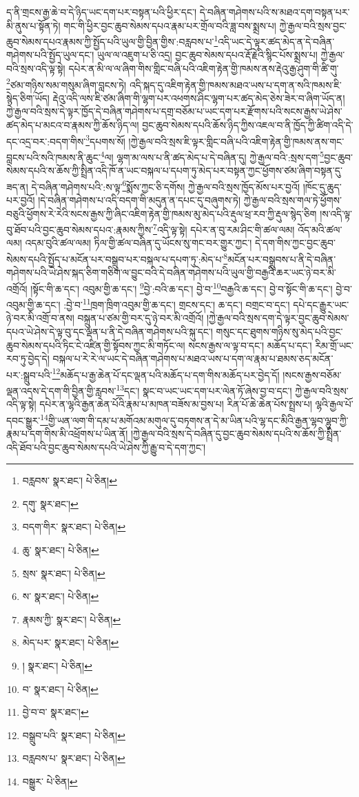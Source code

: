 ད་ནི་གྲངས་རྒྱ་ཆེ་བ་དེ་ཉིད་ཡང་དག་པར་བསྟན་པའི་ཕྱིར་དང་། དེ་བཞིན་གཤེགས་པའི་ས་མཐའ་དག་བསྟན་པར་མི་ནུས་པ་སྟོན་ཏེ། གང་གི་ཕྱིར་བྱང་ཆུབ་སེམས་དཔའ་རྣམ་པར་གྲོལ་བའི་ཟླ་བས་སྨྲས་པ། ཀྱེ་རྒྱལ་བའི་སྲས་བྱང་ཆུབ་སེམས་དཔའ་རྣམས་ཀྱི་སྤྱོད་པའི་ཡུལ་གྱི་བྱིན་གྱིས་:བརླབས་པ་\footnote{བརླབས་  སྣར་ཐང་།  པེ་ཅིན། }འདི་ཡང་དེ་ལྟར་ཚད་མེད་ན་དེ་བཞིན་གཤེགས་པའི་སྤྱོད་ཡུལ་དང་། ཡུལ་ལ་འཇུག་པ་ཅི་འདྲ། བྱང་ཆུབ་སེམས་དཔའ་རྡོ་རྗེའི་སྙིང་པོས་སྨྲས་པ། ཀྱེ་རྒྱལ་བའི་སྲས་འདི་ལྟ་སྟེ། དཔེར་ན་མི་ལ་ལ་ཞིག་གིས་གླིང་བཞི་པའི་འཇིག་རྟེན་གྱི་ཁམས་ནས་རྡེའུ་རྒྱ་ཤུག་གི་ཚི་གུ་\footnote{དགུ་  སྣར་ཐང་། }ཙམ་གཉིས་སམ་གསུམ་ཞིག་བླངས་ཏེ། འདི་སྐད་དུ་འཇིག་རྟེན་གྱི་ཁམས་མཐའ་ཡས་པ་དག་ན་སའི་ཁམས་ཇི་སྙེད་ཅིག་ཡོད། རྡེའུ་འདི་ལས་ཇི་ཙམ་ཞིག་གི་ལྷག་པར་འཕགས་ཤིང་ལྷག་པར་ཚད་མེད་ཅེས་ཟེར་བ་ཞིག་ཡོད་ན། ཀྱེ་རྒྱལ་བའི་སྲས་དེ་ལྟར་ཁྱོད་དེ་བཞིན་གཤེགས་པ་དགྲ་བཅོམ་པ་ཡང་དག་པར་རྫོགས་པའི་སངས་རྒྱས་ཡེ་ཤེས་ཚད་མེད་པ་མངའ་བ་རྣམས་ཀྱི་ཆོས་ཉིད་ལ། བྱང་ཆུབ་སེམས་དཔའི་ཆོས་ཉིད་ཀྱིས་འཇལ་བ་ནི་ཁྱོད་ཀྱི་ཚིག་འདི་དེ་དང་འདྲ་བར་:བདག་གིས་\footnote{བདག་གིར་  སྣར་ཐང་།  པེ་ཅིན། }དཔགས་སོ། །ཀྱེ་རྒྱལ་བའི་སྲས་ཇི་ལྟར་གླིང་བཞི་པའི་འཇིག་རྟེན་གྱི་ཁམས་ནས་གང་བླངས་པའི་སའི་ཁམས་ནི་ཆུང་\footnote{ཆུ་  སྣར་ཐང་།  པེ་ཅིན། }ལ། ལྷག་མ་ལས་པ་ནི་ཚད་མེད་པ་དེ་བཞིན་དུ། ཀྱེ་རྒྱལ་བའི་:སྲས་དག་\footnote{སྲས་  སྣར་ཐང་།  པེ་ཅིན། }བྱང་ཆུབ་སེམས་དཔའི་ས་ཆོས་ཀྱི་སྤྲིན་འདི་ཁོ་ན་ཡང་བསྐལ་པ་དཔག་ཏུ་མེད་པར་བསྟན་ཀྱང་ཕྱོགས་ཙམ་ཞིག་བསྟན་དུ་ཟད་ན། དེ་བཞིན་གཤེགས་པའི་:ས་ལྟ་\footnote{ས་  སྣར་ཐང་།  པེ་ཅིན། }སྨོས་ཀྱང་ཅི་དགོས། ཀྱེ་རྒྱལ་བའི་སྲས་ཁྱོད་མོས་པར་བྱའོ། །ཁོང་དུ་ཆུད་པར་བྱའོ། །དེ་བཞིན་གཤེགས་པ་འདི་བདག་གི་མདུན་ན་དཔང་དུ་བཞུགས་ཏེ། ཀྱེ་རྒྱལ་བའི་སྲས་གལ་ཏེ་ཕྱོགས་བཅུའི་ཕྱོགས་རེ་རེའི་སངས་རྒྱས་ཀྱི་ཞིང་འཇིག་རྟེན་གྱི་ཁམས་མུ་མེད་པའི་རྡུལ་ཕྲ་རབ་ཀྱི་རྡུལ་སྙེད་ཅིག །ས་འདི་ལྟ་བུ་ཐོབ་པའི་བྱང་ཆུབ་སེམས་དཔའ་:རྣམས་ཀྱིས་\footnote{རྣམས་ཀྱི་  སྣར་ཐང་།  པེ་ཅིན། }འདི་ལྟ་སྟེ། དཔེར་ན་བུ་རམ་ཤིང་གི་ཚལ་ལམ། འོད་མའི་ཚལ་ལམ། འདམ་བུའི་ཚལ་ལམ། ཏིལ་གྱི་ཚལ་བཞིན་དུ་ཡོངས་སུ་གང་བར་གྱུར་ཀྱང་། དེ་དག་གིས་ཀྱང་བྱང་ཆུབ་སེམས་དཔའི་སྤྱོད་པ་མངོན་པར་བསྒྲུབ་པར་བསྐལ་པ་དཔག་ཏུ་:མེད་པ་\footnote{མེད་པར་  སྣར་ཐང་།  པེ་ཅིན། }མངོན་པར་བསྒྲུབས་པ་ནི་དེ་བཞིན་གཤེགས་པའི་ཡེ་ཤེས་སྐད་ཅིག་གཅིག་ལ་བྱུང་བའི་དེ་བཞིན་གཤེགས་པའི་ཡུལ་གྱི་བརྒྱའི་ཆར་ཡང་ཉེ་བར་མི་འགྲོའོ། །སྟོང་གི་ཆ་དང་། འབུམ་གྱི་ཆ་དང་། \footnote{།    སྣར་ཐང་།  པེ་ཅིན། }བྱེ་:བའི་ཆ་དང་། བྱེ་བ་\footnote{བ་  སྣར་ཐང་།  པེ་ཅིན། }བརྒྱའི་ཆ་དང་། བྱེ་བ་སྟོང་གི་ཆ་དང་། བྱེ་བ་འབུམ་གྱི་ཆ་དང་། :བྱེ་བ་\footnote{བྱེ་བ་བ་  སྣར་ཐང་། }ཁྲག་ཁྲིག་འབུམ་གྱི་ཆ་དང་། གྲངས་དང་། ཆ་དང་། བགྲང་བ་དང་། དཔེ་དང་རྒྱུར་ཡང་ཉེ་བར་མི་འགྲོ་བ་ནས། བསྐྲུན་པ་ཙམ་གྱི་བར་དུ་ཉེ་བར་མི་འགྲོའོ། །ཀྱེ་རྒྱལ་བའི་སྲས་དག་དེ་ལྟར་བྱང་ཆུབ་སེམས་དཔའ་ཡེ་ཤེས་དེ་ལྟ་བུ་དང་ལྡན་པ་ནི་དེ་བཞིན་གཤེགས་པའི་སྐུ་དང་། གསུང་དང་ཐུགས་གཉིས་སུ་མེད་པའི་བྱང་ཆུབ་སེམས་དཔའི་ཏིང་ངེ་འཛིན་གྱི་སྟོབས་ཀྱང་མི་གཏོང་ལ། སངས་རྒྱས་ལ་ལྟ་བ་དང་། མཆོད་པ་དང་། རིམ་གྲོ་ཡང་རབ་ཏུ་བྱེད་དེ། བསྐལ་པ་རེ་རེ་ལ་ཡང་དེ་བཞིན་གཤེགས་པ་མཐའ་ཡས་པ་དག་ལ་རྣམ་པ་ཐམས་ཅད་མངོན་པར་:སྒྲུབ་པའི་\footnote{བསྒྲུབ་པའི་  སྣར་ཐང་།  པེ་ཅིན། }མཆོད་པ་རྒྱ་ཆེན་པོ་དང་ལྡན་པའི་མཆོད་པ་དག་གིས་མཆོད་པར་བྱེད་དོ། །སངས་རྒྱས་བཅོམ་ལྡན་འདས་དེ་དག་གི་བྱིན་གྱི་རླབས་\footnote{བརླབས་པ་  སྣར་ཐང་།  པེ་ཅིན། }དང་། སྣང་བ་ཡང་ཡང་དག་པར་ལེན་ཏོ་ཞེས་བྱ་བ་དང་། ཀྱེ་རྒྱལ་བའི་སྲས་འདི་ལྟ་སྟེ། དཔེར་ན་ལྷའི་རྒྱན་ཆེན་པོའི་རྣམ་པ་མཁན་བཟོས་མ་བྱས་པ། རིན་པོ་ཆེ་ཆེན་པོས་སྤྲས་པ། ལྷའི་རྒྱལ་པོ་དབང་སྒྱུར་\footnote{བསྒྱུར་  པེ་ཅིན། }གྱི་ཡན་ལག་གི་དམ་པ་མགོའམ་མགུལ་དུ་བཏགས་ན་དེ་མ་ཡིན་པའི་ལྷ་དང་མིའི་རྒྱན་ལྷབ་ལྷུབ་ཀྱི་རྣམ་པ་དག་གིས་མི་འཕྲོགས་པ་ཡིན་ནོ། །ཀྱེ་རྒྱལ་བའི་སྲས་དེ་བཞིན་དུ་བྱང་ཆུབ་སེམས་དཔའི་ས་ཆོས་ཀྱི་སྤྲིན་འདི་ཐོབ་པའི་བྱང་ཆུབ་སེམས་དཔའི་ཡེ་ཤེས་ཀྱི་རྒྱུ་བ་དེ་དག་ཀྱང་། 